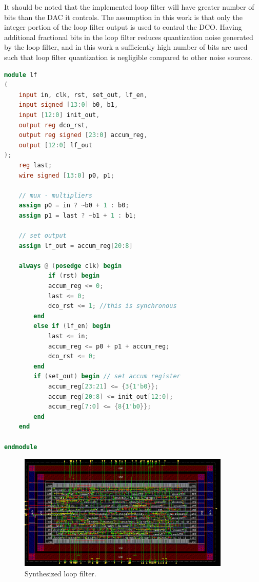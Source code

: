	 It should be noted that the implemented loop filter will have greater number of bits than the DAC it controls. The assumption in this work is that only the integer portion of the loop filter output is used to control the DCO. Having additional fractional bits in the loop filter reduces quantization noise generated by the loop filter, and in this work a sufficiently high number of bits are used such that loop filter quantization is negligible compared to other noise sources. 


	\begin{lstlisting}[language={Verilog}, caption={Loop filter hardware description.}, label={sim_code2}]
module lf
(
	input in, clk, rst, set_out, lf_en,
	input signed [13:0] b0, b1,
	input [12:0] init_out,
	output reg dco_rst,
	output reg signed [23:0] accum_reg,
	output [12:0] lf_out
);
	reg last;
	wire signed [13:0] p0, p1;

	// mux - multipliers
	assign p0 = in ? ~b0 + 1 : b0; 
	assign p1 = last ? ~b1 + 1 : b1; 

	// set output
	assign lf_out = accum_reg[20:8]

	always @ (posedge clk) begin
    		if (rst) begin
			accum_reg <= 0;
			last <= 0;
			dco_rst <= 1; //this is synchronous
		end
		else if (lf_en) begin
			last <= in;
			accum_reg <= p0 + p1 + accum_reg;
			dco_rst <= 0;
		end
		if (set_out) begin // set accum register
			accum_reg[23:21] <= {3{1'b0}};
			accum_reg[20:8] <= init_out[12:0];
			accum_reg[7:0] <= {8{1'b0}};
		end
	end

endmodule
	    \end{lstlisting}


			\begin{figure}[htb!]
			        \centering
			        \includegraphics[width=0.9\textwidth, angle=0]{./figs/design/bbpd_lf_only.png}
			    \caption{Synthesized loop filter.}
			    \label{fig:bbpd_only_lf_lay}
			\end{figure}


